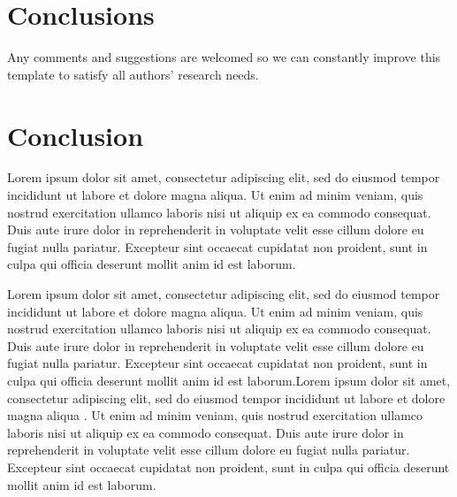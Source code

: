 \section{Conclusions}
    
  Any comments and suggestions are welcomed so we can constantly improve this template to satisfy all authors’ research needs. 
    
\section{Conclusion}
Lorem ipsum dolor sit amet, consectetur adipiscing elit, sed do eiusmod tempor incididunt ut labore et dolore magna aliqua. Ut enim ad minim veniam, quis nostrud exercitation ullamco laboris nisi ut aliquip ex ea commodo consequat. Duis aute irure dolor in reprehenderit in voluptate velit esse cillum dolore eu fugiat nulla pariatur. Excepteur sint occaecat cupidatat non proident, sunt in culpa qui officia deserunt mollit anim id est laborum.

Lorem ipsum dolor sit amet, consectetur adipiscing elit, sed do eiusmod tempor incididunt ut labore et dolore magna aliqua. Ut enim ad minim veniam, quis nostrud exercitation ullamco laboris nisi ut aliquip ex ea commodo consequat. Duis aute irure dolor in reprehenderit in voluptate velit esse cillum dolore eu fugiat nulla pariatur. Excepteur sint occaecat cupidatat non proident, sunt in culpa qui officia deserunt mollit anim id est laborum.Lorem ipsum dolor sit amet, consectetur adipiscing elit, sed do eiusmod tempor incididunt ut labore et dolore magna aliqua . Ut enim ad minim veniam, quis nostrud exercitation ullamco laboris nisi ut aliquip ex ea commodo consequat. Duis aute irure dolor in reprehenderit in voluptate velit esse cillum dolore eu fugiat nulla pariatur. Excepteur sint occaecat cupidatat non proident, sunt in culpa qui officia deserunt mollit anim id est laborum.



